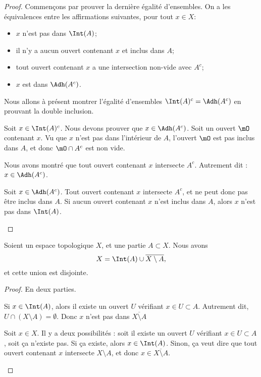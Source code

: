 \begin{proof}
	Commençons par prouver la dernière égalité d'ensembles. On a les équivalences entre les affirmations suivantes, pour tout \( x \in X\):
	\begin{itemize}
		\item \( x\) n'est pas dans \( \Int(A)\);
		\item il n'y a aucun ouvert contenant \( x\) et inclus dans \( A\);
		\item tout ouvert contenant \( x\) a une intersection non-vide avec \( A^c\);
		\item \( x\) est dans \( \Adh({A^c})\).
	\end{itemize}
	Nous allons à présent montrer l'égalité d'ensembles \( \Int(A)^c=\Adh(A^c) \) en prouvant la double inclusion.
	\begin{subproof}
		Soit \( x\in \Int(A)^c\). Nous devons prouver que \( x\in \Adh(A^c)\). Soit un ouvert \( \mO\) contenant \( x\). Vu que \( x\) n'est pas dans l'intérieur de \( A\), l'ouvert \( \mO\) est pas inclus dans \( A\), et donc \( \mO\cap A^c\) est non vide.

		Nous avons montré que tout ouvert contenant \( x\) intersecte \( A^c\). Autrement dit : \( x\in\Adh(A^c)\).


		Soit \( x\in \Adh(A^c)\). Tout ouvert contenant \( x\) intersecte \( A^c\), et ne peut donc pas être inclus dans \( A\). Si aucun ouvert contenant \( x\) n'est inclus dans \( A\), alors \( x\) n'est pas dans \( \Int(A)\).
	\end{subproof}
\end{proof}

\begin{proposition}	\label{PROPooTTWBooOyxWzr}
	Soient un espace topologique \( X\), et une partie \( A\subset X\). Nous avons
	\begin{equation}
		X=\Int(A)\cup\overline{X\setminus A},
	\end{equation}
	et cette union est disjointe.
\end{proposition}

\begin{proof}
	En deux parties.
	\begin{subproof}
		\spitem[Disjoint]
		Si \( x\in \Int(A)\), alors il existe un ouvert \( U\) vérifiant \( x\in U\subset A\). Autrement dit, \( U\cap(X\setminus A)=\emptyset\). Donc \( x\) n'est pas dans \( \overline{X\setminus A}\)

		\spitem[Union]
		Soit \( x\in X\). Il y a deux possibilités : soit il existe un ouvert \( U\) vérifiant \( x\in U\subset A\), soit ça n'existe pas. Si ça existe, alors \( x\in \Int(A)\). Sinon, ça veut dire que tout ouvert contenant \( x\) intersecte \( X\setminus A\), et donc \( x\in\overline{X\setminus A}\).
	\end{subproof}
\end{proof}

